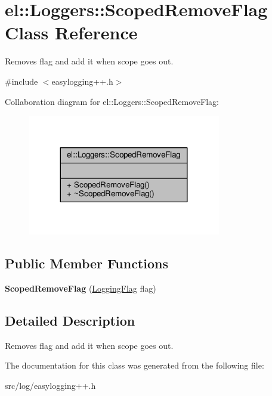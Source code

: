 \hypertarget{classel_1_1Loggers_1_1ScopedRemoveFlag}{}\section{el\+:\+:Loggers\+:\+:Scoped\+Remove\+Flag Class Reference}
\label{classel_1_1Loggers_1_1ScopedRemoveFlag}


Removes flag and add it when scope goes out.  




{\ttfamily \#include $<$easylogging++.\+h$>$}



Collaboration diagram for el\+:\+:Loggers\+:\+:Scoped\+Remove\+Flag\+:
\nopagebreak
\begin{figure}[H]
\begin{center}
\leavevmode
\includegraphics[width=239pt]{db/d4d/classel_1_1Loggers_1_1ScopedRemoveFlag__coll__graph}
\end{center}
\end{figure}
\subsection*{Public Member Functions}
\begin{DoxyCompactItemize}
\item 
{\bfseries Scoped\+Remove\+Flag} (\hyperlink{namespaceel_a2784aacd04cb7816ac1c0b20fcbf83cb}{Logging\+Flag} flag)\hypertarget{classel_1_1Loggers_1_1ScopedRemoveFlag_a7ae9a1cde34e1145d8b90b639cc12dc1}{}\label{classel_1_1Loggers_1_1ScopedRemoveFlag_a7ae9a1cde34e1145d8b90b639cc12dc1}

\end{DoxyCompactItemize}


\subsection{Detailed Description}
Removes flag and add it when scope goes out. 

The documentation for this class was generated from the following file\+:\begin{DoxyCompactItemize}
\item 
src/log/easylogging++.\+h\end{DoxyCompactItemize}
